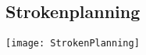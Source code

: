 \begin{appendix}

	\chapter{Strokenplanning}
	\label{Chapter:Strokenplanning}
	\begin{graphic}
	 \texttt{[image: StrokenPlanning]}
	\end{graphic}
\end{appendix}
